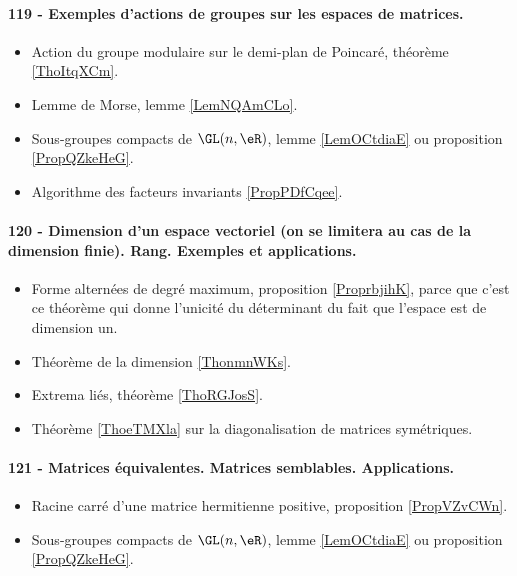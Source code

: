\paragraph{119 - Exemples d’actions de groupes sur les espaces de matrices.}
\begin{itemize}
    \item Action du groupe modulaire sur le demi-plan de Poincaré, théorème \ref{ThoItqXCm}.
    \item Lemme de Morse, lemme \ref{LemNQAmCLo}.
    \item Sous-groupes compacts de \( \GL(n,\eR)\), lemme \ref{LemOCtdiaE} ou proposition \ref{PropQZkeHeG}.
    \item Algorithme des facteurs invariants \ref{PropPDfCqee}.
\end{itemize}

\paragraph{120 - Dimension d'un espace vectoriel (on se limitera au cas de la dimension finie). Rang. Exemples et applications.}
\begin{itemize}
    \item Forme alternées de degré maximum, proposition \ref{ProprbjihK}, parce que c'est ce théorème qui donne l'unicité du déterminant du fait que l'espace est de dimension un.
    \item Théorème de la dimension \ref{ThonmnWKs}.
    \item Extrema liés, théorème \ref{ThoRGJosS}.
    \item Théorème \ref{ThoeTMXla} sur la diagonalisation de matrices symétriques.
\end{itemize}
\paragraph{121 - Matrices équivalentes. Matrices semblables. Applications.}
\begin{itemize}
    \item Racine carré d'une matrice hermitienne positive, proposition \ref{PropVZvCWn}.
    \item Sous-groupes compacts de \( \GL(n,\eR)\), lemme \ref{LemOCtdiaE} ou proposition \ref{PropQZkeHeG}.
\end{itemize}
